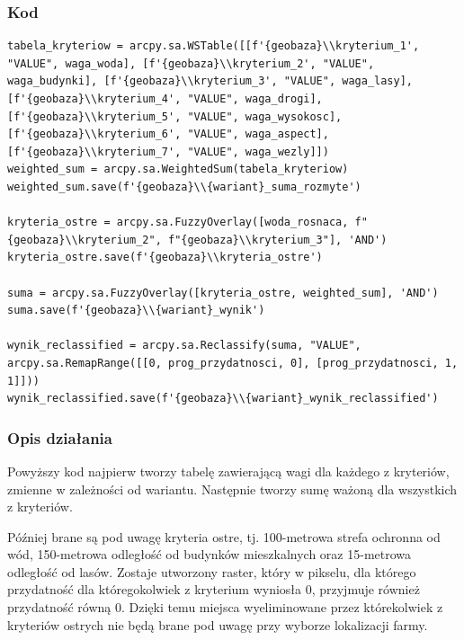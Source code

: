 \documentclass{article}
\begin{document}
\subsubsection{Kod}
\begin{lstlisting}
tabela_kryteriow = arcpy.sa.WSTable([[f'{geobaza}\\kryterium_1', "VALUE", waga_woda], [f'{geobaza}\\kryterium_2', "VALUE", waga_budynki], [f'{geobaza}\\kryterium_3', "VALUE", waga_lasy], [f'{geobaza}\\kryterium_4', "VALUE", waga_drogi], [f'{geobaza}\\kryterium_5', "VALUE", waga_wysokosc], [f'{geobaza}\\kryterium_6', "VALUE", waga_aspect], [f'{geobaza}\\kryterium_7', "VALUE", waga_wezly]])
weighted_sum = arcpy.sa.WeightedSum(tabela_kryteriow)
weighted_sum.save(f'{geobaza}\\{wariant}_suma_rozmyte')

kryteria_ostre = arcpy.sa.FuzzyOverlay([woda_rosnaca, f"{geobaza}\\kryterium_2", f"{geobaza}\\kryterium_3"], 'AND')
kryteria_ostre.save(f'{geobaza}\\kryteria_ostre')

suma = arcpy.sa.FuzzyOverlay([kryteria_ostre, weighted_sum], 'AND')
suma.save(f'{geobaza}\\{wariant}_wynik')

wynik_reclassified = arcpy.sa.Reclassify(suma, "VALUE", arcpy.sa.RemapRange([[0, prog_przydatnosci, 0], [prog_przydatnosci, 1, 1]]))
wynik_reclassified.save(f'{geobaza}\\{wariant}_wynik_reclassified')
\end{lstlisting}

\subsubsection{Opis działania}
Powyższy kod najpierw tworzy tabelę zawierającą wagi dla każdego z kryteriów, zmienne w zależności od wariantu. Następnie tworzy sumę ważoną dla wszystkich z kryteriów.

Później brane są pod uwagę kryteria ostre, tj. 100-metrowa strefa ochronna od wód, 150-metrowa odległość od budynków mieszkalnych oraz 15-metrowa odległość od lasów. Zostaje utworzony raster, który w pikselu, dla którego przydatność dla któregokolwiek z kryterium wyniosła 0, przyjmuje również przydatność równą 0. Dzięki temu miejsca wyeliminowane przez którekolwiek z kryteriów ostrych nie będą brane pod uwagę przy wyborze lokalizacji farmy. 
\end{document}

